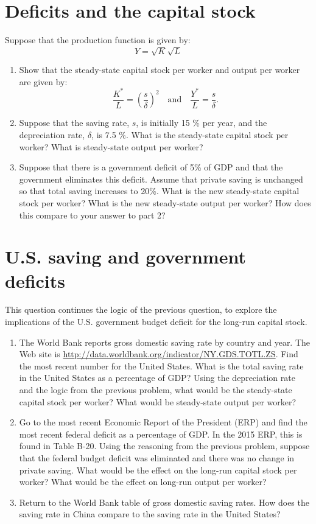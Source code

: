 \documentclass[]{book}
\begin{document}
\section{Deficits and the capital
stock}\label{deficits-and-the-capital-stock}

Suppose that the production function is given by: \[Y=\sqrt{K}\sqrt{L}\]

\begin{enumerate}
\def\labelenumi{\arabic{enumi}.}
\item
  Show that the steady-state capital stock per worker and output per
  worker are given by:
  \[\frac{K^{*}}{L}=\left(\frac{s}{\delta}\right)^{2} \quad \text{and} \quad \frac{Y^{*}}{L}=\frac{s}{\delta}.\]
\item
  Suppose that the saving rate, \(s\), is initially 15 \% per year, and
  the depreciation rate, \(\delta\), is 7.5 \%. What is the steady-state
  capital stock per worker? What is steady-state output per worker?
\item
  Suppose that there is a government deficit of 5\% of GDP and that the
  government eliminates this deficit. Assume that private saving is
  unchanged so that total saving increases to 20\%. What is the new
  steady-state capital stock per worker? What is the new steady-state
  output per worker? How does this compare to your answer to part 2?
\end{enumerate}

\section{U.S. saving and government
deficits}\label{u.s.-saving-and-government-deficits}

This question continues the logic of the previous question, to explore
the implications of the U.S. government budget deficit for the long-run
capital stock.

\begin{enumerate}
\def\labelenumi{\arabic{enumi}.}
\item
  The World Bank reports gross domestic saving rate by country and year.
  The Web site is
  \url{http://data.worldbank.org/indicator/NY.GDS.TOTL.ZS}. Find the
  most recent number for the United States. What is the total saving
  rate in the United States as a percentage of GDP? Using the
  depreciation rate and the logic from the previous problem, what would
  be the steady-state capital stock per worker? What would be
  steady-state output per worker?
\item
  Go to the most recent Economic Report of the President (ERP) and find
  the most recent federal deficit as a percentage of GDP. In the 2015
  ERP, this is found in Table B-20. Using the reasoning from the
  previous problem, suppose that the federal budget deficit was
  eliminated and there was no change in private saving. What would be
  the effect on the long-run capital stock per worker? What would be the
  effect on long-run output per worker?
\item
  Return to the World Bank table of gross domestic saving rates. How
  does the saving rate in China compare to the saving rate in the United
  States?
\end{enumerate}
\end{document}
